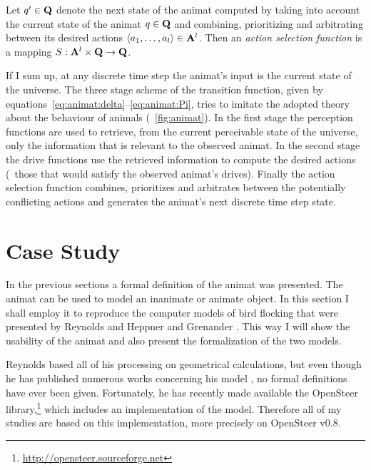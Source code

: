 \begin{defn}
\label{def:animat:S}
Let $q' \in {\ensuremath{\mathbf{Q}}}$ denote the next state of the animat computed by taking into account the current state of the animat $q \in {\ensuremath{\mathbf{Q}}}$ and combining, prioritizing and arbitrating between its desired actions $\langle a_1,\ldots,a_l\rangle \in {\ensuremath{\mathbf{A}}}^l$. Then an \emph{action selection function} is a mapping $S: {\mathbf{A}}^l \times {\ensuremath{\mathbf{Q}}} \rightarrow {\ensuremath{\mathbf{Q}}}$.
\end{defn}

If I sum up, at any discrete time step the animat's input is the current state of the universe. The three stage scheme of the transition function, given by equations~\eqref{eq:animat:delta}--\eqref{eq:animat:Pi}, tries to imitate the adopted theory about the behaviour of animals (\fig~\ref{fig:animat}). In the first stage the perception functions are used to retrieve, from the current perceivable state of the universe, only the information that is relevant to the observed animat. In the second stage the drive functions use the retrieved information to compute the desired actions (\ie\ those that would satisfy the observed animat's drives). Finally the action selection function combines, prioritizes and arbitrates between the potentially conflicting actions and generates the animat's next discrete time step state. 


\section{Case Study}
In the previous sections a formal definition of the animat was  presented. The animat can be used to model an inanimate or animate object. In this section I shall employ it to reproduce the computer models of bird flocking that were presented by Reynolds \cite{reynolds:1987} and Heppner and Grenander \cite{heppner:1990}. This way I will show the usability of the animat and also present the formalization of the two models. 

Reynolds based all of his processing on geometrical calculations, but even though he has published numerous works concerning his model \cite{reynolds:1987,reynolds:1993a,reynolds:1993b,reynolds:1994,reynolds:1999,reynolds:2000}, no formal definitions have ever been given. Fortunately, he has recently made available the OpenSteer library,\footnote{\href{http://opensteer.sourceforge.net}{http://opensteer.sourceforge.net}} which includes an implementation of the model. Therefore all of my studies are based on this implementation, more precisely on OpenSteer v0.8.

